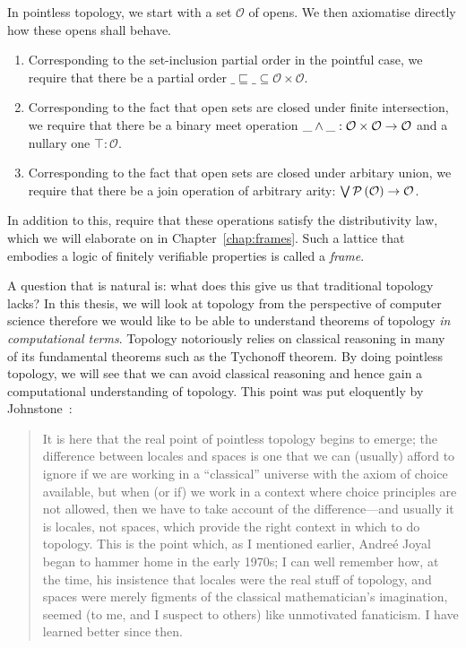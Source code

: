 In pointless topology, we start with a set $\mathcal{O}$ of opens. We then axiomatise
directly how these opens shall behave.
\begin{enumerate}
  \item Corresponding to the set-inclusion partial order in the pointful case, we require that
    there be a partial order $\_\sqsubseteq\_ \subseteq \mathcal{O} \times \mathcal{O}$.
  \item Corresponding to the fact that open sets are closed under finite intersection, we
    require that there be a binary meet operation $\meet{\_}{\_} : \mathcal{O} \times
    \mathcal{O} \rightarrow \mathcal{O}$ and a nullary one $\top : \mathcal{O}$.
  \item Corresponding to the fact that open sets are closed under arbitary union, we
    require that there be a join operation of arbitrary arity: $\joinnm{}\_ :
    \pow{\mathcal{O}} \rightarrow \mathcal{O}$.
\end{enumerate}
In addition to this, require that these operations satisfy the distributivity law, which
we will elaborate on in Chapter~\ref{chap:frames}. Such a lattice that embodies a logic
of finitely verifiable properties is called a \emph{frame}.

 A question that is natural
is: what does this give us that traditional topology lacks? In this thesis, we will look
at topology from the perspective of computer science therefore we would like to be able to
understand theorems of topology \emph{in computational terms}. Topology notoriously relies
on classical reasoning in many of its fundamental theorems such as the Tychonoff theorem.
By doing pointless topology, we will see that we can avoid classical reasoning and hence
gain a computational understanding of topology. This point was put eloquently by
Johnstone~\cite[pg.~46]{stone-spaces}:
\begin{quote}
  It is here that the real point of pointless topology begins to emerge; the difference
  between locales and spaces is one that we can (usually) afford to ignore if we are
  working in a ``classical'' universe with the axiom of choice available, but when (or if)
  we work in a context where choice principles are not allowed, then we have to take
  account of the difference—and usually it is locales, not spaces, which provide the right
  context in which to do topology. This is the point which, as I mentioned earlier,
  Andre\'{e} Joyal began to hammer home in the early 1970s; I can well remember how, at
  the time, his insistence that locales were the real stuff of topology, and spaces were
  merely figments of the classical mathematician's imagination, seemed (to me, and I
  suspect to others) like unmotivated fanaticism. I have learned better since then.
\end{quote}


